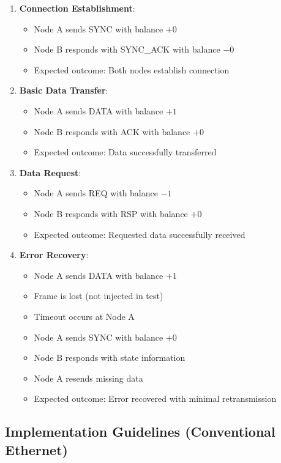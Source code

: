 \documentclass[../OAE-SPEC-MAIN.tex]{subfiles}
\begin{document}
\begin{enumerate}
    \item \textbf{Connection Establishment}:
    \begin{itemize}
        \item Node A sends SYNC with balance $+0$
        \item Node B responds with SYNC\_ACK with balance $-0$
        \item Expected outcome: Both nodes establish connection
    \end{itemize}
    
    \item \textbf{Basic Data Transfer}:
    \begin{itemize}
        \item Node A sends DATA with balance $+1$
        \item Node B responds with ACK with balance $+0$
        \item Expected outcome: Data successfully transferred
    \end{itemize}
    
    \item \textbf{Data Request}:
    \begin{itemize}
        \item Node A sends REQ with balance $-1$
        \item Node B responds with RSP with balance $+0$
        \item Expected outcome: Requested data successfully received
    \end{itemize}
    
    \item \textbf{Error Recovery}:
    \begin{itemize}
        \item Node A sends DATA with balance $+1$
        \item Frame is lost (not injected in test)
        \item Timeout occurs at Node A
        \item Node A sends SYNC with balance $+0$
        \item Node B responds with state information
        \item Node A resends missing data
        \item Expected outcome: Error recovered with minimal retransmission
    \end{itemize}
\end{enumerate}

\subsection{Implementation Guidelines (Conventional Ethernet)}
\end{document}
